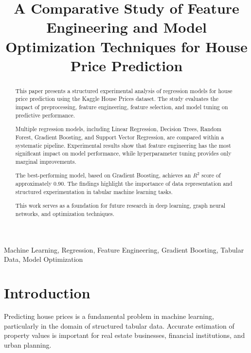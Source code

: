 \documentclass[conference]{IEEEtran}
\begin{document}
\title{A Comparative Study of Feature Engineering and Model Optimization Techniques for House Price Prediction}

\author{
}

\maketitle

\begin{abstract}
This paper presents a structured experimental analysis of regression models for house price prediction using the Kaggle House Prices dataset. The study evaluates the impact of preprocessing, feature engineering, feature selection, and model tuning on predictive performance.

Multiple regression models, including Linear Regression, Decision Trees, Random Forest, Gradient Boosting, and Support Vector Regression, are compared within a systematic pipeline. Experimental results show that feature engineering has the most significant impact on model performance, while hyperparameter tuning provides only marginal improvements.

The best-performing model, based on Gradient Boosting, achieves an $R^2$ score of approximately 0.90. The findings highlight the importance of data representation and structured experimentation in tabular machine learning tasks.

This work serves as a foundation for future research in deep learning, graph neural networks, and optimization techniques.
\end{abstract}

\begin{IEEEkeywords}
Machine Learning, Regression, Feature Engineering, Gradient Boosting, Tabular Data, Model Optimization
\end{IEEEkeywords}

\section{Introduction}

Predicting house prices is a fundamental problem in machine learning, particularly in the domain of structured tabular data. Accurate estimation of property values is important for real estate businesses, financial institutions, and urban planning.
\end{document}
